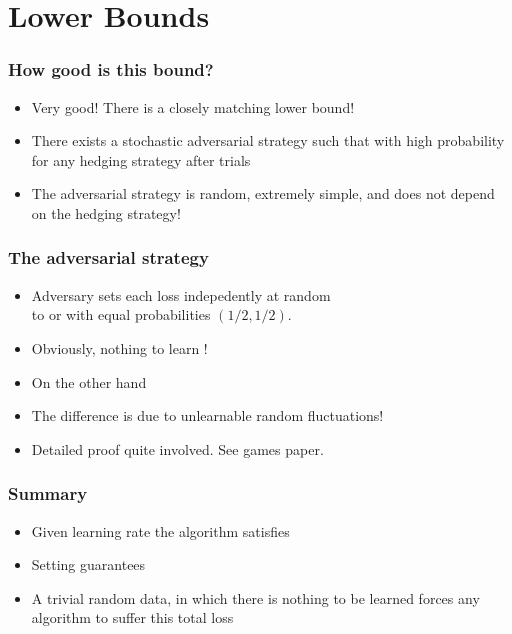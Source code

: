 \documentclass[handout]{beamer}
\begin{document}
\section{Lower Bounds}
\begin{frame}
\frametitle{How good is this bound?}
\begin{itemize}
\item
{\color{blue} Very good!} There is a closely matching lower bound!
\item
There exists a stochastic adversarial strategy such that with high
probability for \alert{any} hedging strategy  after  trials
\item
The adversarial strategy is random, extremely simple, and does not
depend on the hedging strategy! 
\end{itemize}
\end{frame}

\begin{frame}
\frametitle{The adversarial strategy}
\begin{itemize}
\item
Adversary sets each loss  indepedently at random \\
to  or  with equal probabilities $(1/2,1/2)$.
\item
Obviously, nothing to learn !\\
\item
On the other hand 
\item
The difference  is due to unlearnable
random fluctuations!
\item
Detailed proof quite involved. See games paper.
\end{itemize}
\end{frame}

\begin{frame}
\frametitle{Summary}
\begin{itemize}
\item Given learning rate \R{$\eta$} the \ouralg algorithm satisfies
\item Setting  guarantees
\item
A trivial random data, in which there is nothing to be learned forces
\alert{any} algorithm to suffer this total loss
\end{itemize}
\end{frame}
\end{document}
